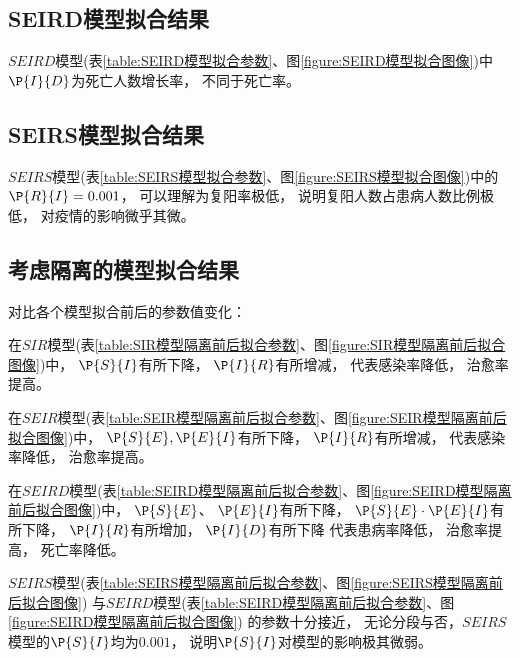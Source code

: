 \subsection{SEIRD模型拟合结果}
\par $SEIRD$模型(表\ref{table:SEIRD模型拟合参数}、图\ref{figure:SEIRD模型拟合图像})中$\P{I}{D}$为死亡人数增长率，
不同于死亡率。
\subsection{SEIRS模型拟合结果}
\par $SEIRS$模型(表\ref{table:SEIRS模型拟合参数}、图\ref{figure:SEIRS模型拟合图像})中的$\P{R}{I}=0.001$，
可以理解为复阳率极低，
说明复阳人数占患病人数比例极低，
对疫情的影响微乎其微。
\subsection{考虑隔离的模型拟合结果}
\par 对比各个模型拟合前后的参数值变化：
\par 在$SIR$模型(表\ref{table:SIR模型隔离前后拟合参数}、图\ref{figure:SIR模型隔离前后拟合图像})中，
$\P{S}{I}$有所下降，
$\P{I}{R}$有所增减，
代表感染率降低，
治愈率提高。
\par 在$SEIR$模型(表\ref{table:SEIR模型隔离前后拟合参数}、图\ref{figure:SEIR模型隔离前后拟合图像})中，
$\P{S}{E},\P{E}{I}$有所下降，
$\P{I}{R}$有所增减，
代表感染率降低，
治愈率提高。
\par 在$SEIRD$模型(表\ref{table:SEIRD模型隔离前后拟合参数}、图\ref{figure:SEIRD模型隔离前后拟合图像})中，
$\P{S}{E}$、
$\P{E}{I}$有所下降，
$\P{S}{E}\cdot \P{E}{I}$有所下降，
$\P{I}{R}$有所增加，
$\P{I}{D}$有所下降
代表患病率降低，
治愈率提高，
死亡率降低。
\par $SEIRS$模型(表\ref{table:SEIRS模型隔离前后拟合参数}、图\ref{figure:SEIRS模型隔离前后拟合图像})
与$SEIRD$模型(表\ref{table:SEIRD模型隔离前后拟合参数}、图\ref{figure:SEIRD模型隔离前后拟合图像})
的参数十分接近，
无论分段与否，$SEIRS$模型的$\P{S}{I}$均为$0.001$，
说明$\P{S}{I}$对模型的影响极其微弱。
